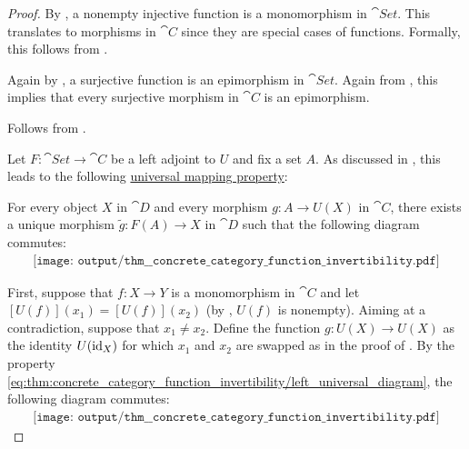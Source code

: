 \begin{proof}
   By , a nonempty injective function is a monomorphism in \( \cat{Set} \). This translates to morphisms in \( \cat{C} \) since they are special cases of functions. Formally, this follows from .

   Again by , a surjective function is an epimorphism in \( \cat{Set} \). Again from , this implies that every surjective morphism in \( \cat{C} \) is an epimorphism.

   Follows from .

   Let \( F: \cat{Set} \to \cat{C} \) be a left adjoint to \( U \) and fix a set \( A \). As discussed in , this leads to the following \hyperref[rem:universal_mapping_property]{universal mapping property}:
  \begin{displayquote}
    For every object \( X \) in \( \cat{D} \) and every morphism \( g: A \to U(X) \) in \( \cat{C} \), there exists a unique morphism \( \widetilde{g}: F(A) \to X \) in \( \cat{D} \) such that the following diagram commutes:
    \begin{equation}\label{eq:thm:concrete_category_function_invertibility/left_universal_diagram}
      \begin{aligned}
        \texttt{[image: output/thm\_\_concrete\_category\_function\_invertibility.pdf]}
      \end{aligned}
    \end{equation}
  \end{displayquote}

  First, suppose that \( f: X \to Y \) is a monomorphism in \( \cat{C} \) and let \( [U(f)](x_1) = [U(f)](x_2) \) (by , \( U(f) \) is nonempty). Aiming at a contradiction, suppose that \( x_1 \neq x_2 \). Define the function \( g: U(X) \to U(X) \) as the identity \( U(\operatorname{id}_X) \) for which \( x_1 \) and \( x_2 \) are swapped as in the proof of . By the property \eqref{eq:thm:concrete_category_function_invertibility/left_universal_diagram}, the following diagram commutes:
  \begin{equation}\label{eq:thm:concrete_category_function_invertibility/left_diagram}
    \begin{aligned}
      \texttt{[image: output/thm\_\_concrete\_category\_function\_invertibility.pdf]}
    \end{aligned}
  \end{equation}


\end{proof}
